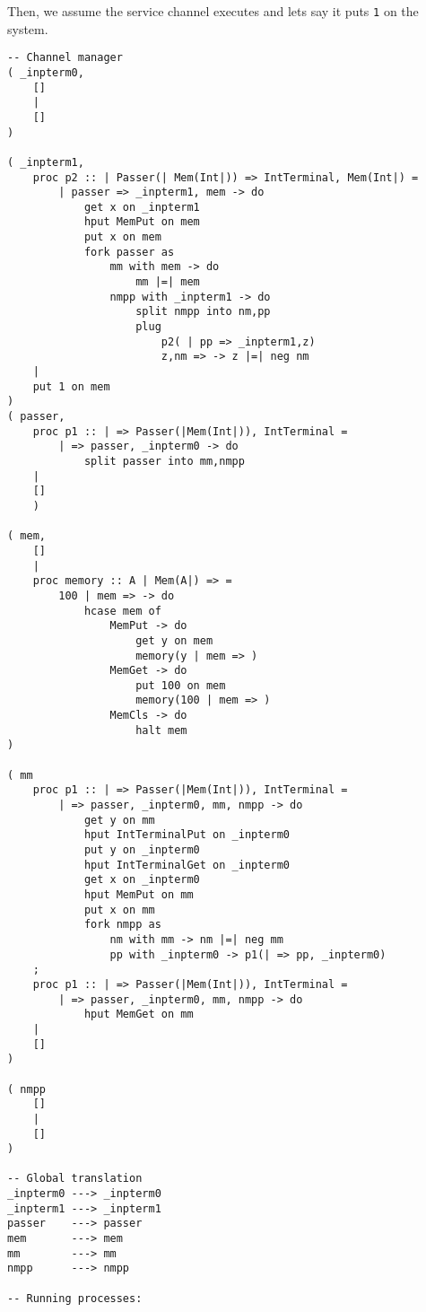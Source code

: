 \documentclass{article}
\theoremstyle{plain}%
\theoremstyle{definition}
\theoremstyle{remark}
\begin{document}
Then, we assume the service channel executes and lets say it puts \verb|1| on the system.
\begin{verbatim}
-- Channel manager
( _inpterm0,  
    []
    |
    []
)

( _inpterm1,  
    proc p2 :: | Passer(| Mem(Int|)) => IntTerminal, Mem(Int|) =
        | passer => _inpterm1, mem -> do
            get x on _inpterm1
            hput MemPut on mem
            put x on mem
            fork passer as
                mm with mem -> do
                    mm |=| mem
                nmpp with _inpterm1 -> do
                    split nmpp into nm,pp
                    plug
                        p2( | pp => _inpterm1,z)
                        z,nm => -> z |=| neg nm
    |
    put 1 on mem
)
( passer,
    proc p1 :: | => Passer(|Mem(Int|)), IntTerminal = 
        | => passer, _inpterm0 -> do
            split passer into mm,nmpp 
    |
    []
    )

( mem,
    []
    |
    proc memory :: A | Mem(A|) => =
        100 | mem => -> do
            hcase mem of
                MemPut -> do
                    get y on mem
                    memory(y | mem => )
                MemGet -> do
                    put 100 on mem
                    memory(100 | mem => )
                MemCls -> do
                    halt mem
)

( mm
    proc p1 :: | => Passer(|Mem(Int|)), IntTerminal = 
        | => passer, _inpterm0, mm, nmpp -> do
            get y on mm
            hput IntTerminalPut on _inpterm0
            put y on _inpterm0
            hput IntTerminalGet on _inpterm0
            get x on _inpterm0
            hput MemPut on mm
            put x on mm
            fork nmpp as
                nm with mm -> nm |=| neg mm
                pp with _inpterm0 -> p1(| => pp, _inpterm0)
    ;
    proc p1 :: | => Passer(|Mem(Int|)), IntTerminal = 
        | => passer, _inpterm0, mm, nmpp -> do
            hput MemGet on mm 
    |
    []
)

( nmpp
    []
    |
    []
)

-- Global translation
_inpterm0 ---> _inpterm0 
_inpterm1 ---> _inpterm1 
passer    ---> passer 
mem       ---> mem
mm        ---> mm
nmpp      ---> nmpp

-- Running processes:
\end{verbatim}
\end{document}
